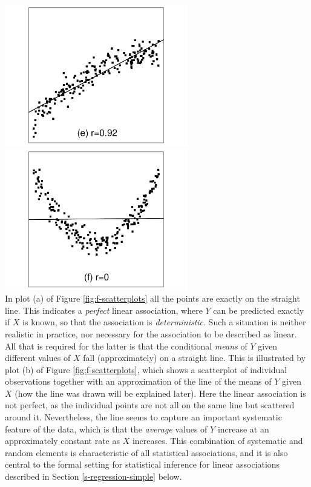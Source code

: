 \documentclass[11pt,a4paper,openany]{book}
\begin{document}
\includegraphics[width=8.00000cm]{olspl5.pdf}
\includegraphics[width=8.00000cm]{olspl6.pdf}\\
In plot (a) of Figure \ref{fig:f-scatterplots} all the points are
exactly on the straight line. This indicates a \emph{perfect} linear
association, where \(Y\) can be predicted exactly if \(X\) is known, so
that the association is \emph{deterministic}. Such a situation is
neither realistic in practice, nor necessary for the association to be
described as linear. All that is required for the latter is that the
conditional \emph{means} of \(Y\) given different values of \(X\) fall
(approximately) on a straight line. This is illustrated by plot (b) of
Figure \ref{fig:f-scatterplots}, which shows a scatterplot of individual
observations together with an approximation of the line of the means of
\(Y\) given \(X\) (how the line was drawn will be explained later). Here
the linear association is not perfect, as the individual points are not
all on the same line but scattered around it. Nevertheless, the line
seems to capture an important systematic feature of the data, which is
that the \emph{average} values of \(Y\) increase at an approximately
constant rate as \(X\) increases. This combination of systematic and
random elements is characteristic of all statistical associations, and
it is also central to the formal setting for statistical inference for
linear associations described in Section \ref{s-regression-simple}
below.
\end{document}
